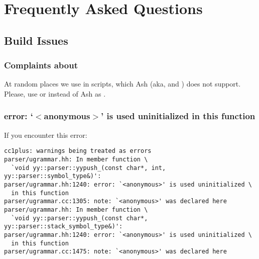 
\chapter{Frequently Asked Questions}
\label{sec:faq}

\ifx\ifHtml\undefined\else
  \let\subsubsectionSave\subsubsection
  \let\subsubsection\faqsection
\fi

\section{Build Issues}
\label{sec:faq:build}

\subsection{Complaints about \samp{+=}}
At random places we use \samp{+=} in  scripts, which Ash
(aka,  and ) does not support.  Please, use
 or  instead of Ash as .

\subsection{error: `$<$anonymous$>$' is used uninitialized in this function}
\label{sec:faq:build:uninitialized}

If you encounter this error:

\begin{verbatim}
cc1plus: warnings being treated as errors
parser/ugrammar.hh: In member function \
  `void yy::parser::yypush_(const char*, int, yy::parser::symbol_type&)':
parser/ugrammar.hh:1240: error: `<anonymous>' is used uninitialized \
  in this function
parser/ugrammar.cc:1305: note: `<anonymous>' was declared here
parser/ugrammar.hh: In member function \
  `void yy::parser::yypush_(const char*, yy::parser::stack_symbol_type&)':
parser/ugrammar.hh:1240: error: `<anonymous>' is used uninitialized \
  in this function
parser/ugrammar.cc:1475: note: `<anonymous>' was declared here
\end{verbatim}

